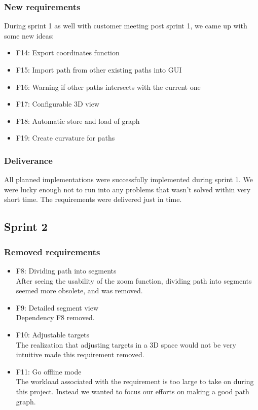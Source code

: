 \documentclass{report}
\begin{document}
\subsubsection{New requirements}
During sprint 1 as well with customer meeting post sprint 1,  we came up with some new ideas:
\begin{itemize}
    \item F14: Export coordinates function
    \item F15: Import path from other existing paths into GUI
    \item F16: Warning if other paths intersects with the current one
    \item F17: Configurable 3D view
    \item F18: Automatic store and load of graph
    \item F19: Create curvature for paths
\end{itemize}

\subsubsection{Deliverance}
All planned implementations were successfully implemented during sprint 1. We were lucky enough not to run into any problems that wasn't solved within very short time. The requirements were delivered just in time.

\subsection{Sprint 2} \label{sec:sprint2_requirementsevolution}

\subsubsection{Removed requirements}
\begin{itemize}
    \item F8: Dividing path into segments \\
    After seeing the usability of the zoom function, dividing path into segments seemed more obsolete, and was removed.
    \item F9: Detailed segment view \\
    Dependency F8 removed.
    \item F10: Adjustable targets \\
    The realization that adjusting targets in a 3D space would not be very intuitive made this requirement removed.
    \item F11: Go offline mode \\
    The workload associated with the requirement is too large to take on during this project. Instead we wanted to focus our efforts on making a good path graph.
\end{itemize}
\end{document}
